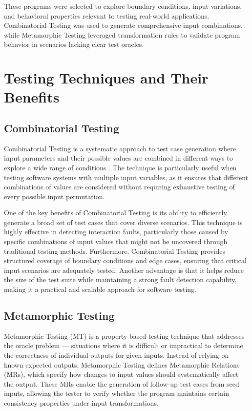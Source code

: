 \documentclass[conference]{IEEEtran}
\begin{document}
These programs were selected to explore boundary conditions, input variations, and behavioral properties relevant to testing real-world applications. Combinatorial Testing was used to generate comprehensive input combinations, while Metamorphic Testing leveraged transformation rules to validate program behavior in scenarios lacking clear test oracles.

\section{Testing Techniques and Their Benefits}
\subsection{Combinatorial Testing}
Combinatorial Testing is a systematic approach to test case generation where input parameters and their possible values are combined in different ways to explore a wide range of conditions \cite{b4}. The technique is particularly useful when testing software systems with multiple input variables, as it ensures that different combinations of values are considered without requiring exhaustive testing of every possible input permutation.

One of the key benefits of Combinatorial Testing is its ability to efficiently generate a broad set of test cases that cover diverse scenarios. This technique is highly effective in detecting interaction faults, particularly those caused by specific combinations of input values that might not be uncovered through traditional testing methods. Furthermore, Combinatorial Testing provides structured coverage of boundary conditions and edge cases, ensuring that critical input scenarios are adequately tested. Another advantage is that it helps reduce the size of the test suite while maintaining a strong fault detection capability, making it a practical and scalable approach for software testing.

\subsection{Metamorphic Testing}
Metamorphic Testing (MT) is a property-based testing technique that addresses the oracle problem — situations where it is difficult or impractical to determine the correctness of individual outputs for given inputs. Instead of relying on known expected outputs, Metamorphic Testing defines Metamorphic Relations (MRs), which specify how changes to input values should systematically affect the output. These MRs enable the generation of follow-up test cases from seed inputs, allowing the tester to verify whether the program maintains certain consistency properties under input transformations.
\end{document}
